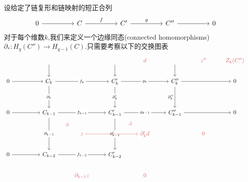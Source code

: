 \documentclass{article}
\begin{document}
\begin{definition}
    设给定了链复形和链映射的短正合列
    \[\begin{tikzcd}
        0 && C && {C'} && {C''} && 0
        \arrow["g", from=1-5, to=1-7]
        \arrow["f", from=1-3, to=1-5]
        \arrow[from=1-7, to=1-9]
        \arrow[from=1-1, to=1-3]
    \end{tikzcd}\]
    对于每个维数$k$,我们来定义一个边缘同态(connected homomorphisms)$\partial_* : H_q(C'') \to H_{q-1}(C)$.只需要考察以下的交换图表
    \[\begin{tikzcd}
        && {} && {} & \textcolor{rgb,255:red,214;green,92;blue,92}{d} & {} & \textcolor{rgb,255:red,214;green,92;blue,92}{z''} & \textcolor{rgb,255:red,214;green,92;blue,92}{Z_k(C_\cdot'')} \\
        0 && {C_{k}} && {C_k'} && {C_k''} && 0 \\
        \\
        0 && {C_{k-1}} && {C_{k-1}'} && {C_{k-1}''} && 0 \\
        &&& \textcolor{rgb,255:red,214;green,92;blue,92}{z} && \textcolor{rgb,255:red,214;green,92;blue,92}{\partial'_k{d}} && \textcolor{rgb,255:red,214;green,92;blue,92}{0} \\
        0 && {C_{k-2}} && {C_{k-2}'} \\
        &&& \textcolor{rgb,255:red,214;green,92;blue,92}{\partial_{k-1}z} && \textcolor{rgb,255:red,214;green,92;blue,92}{0}
        \arrow[from=2-1, to=2-3]
        \arrow["{f_k}"{description}, from=2-3, to=2-5]
        \arrow["{g_k}"{description}, from=2-5, to=2-7]
        \arrow[from=2-7, to=2-9]
        \arrow[from=1-3, to=2-3]
        \arrow[from=1-5, to=2-5]
        \arrow["{\partial_{k}}"{description}, from=2-3, to=4-3]
        \arrow[from=4-1, to=4-3]
        \arrow["{f_{k-1}}"{description}, from=4-3, to=4-5]
        \arrow["{\partial'_{k}}"{description}, from=2-5, to=4-5]
        \arrow["{g_{k-1}}"{description}, from=4-5, to=4-7]
        \arrow[from=1-7, to=2-7]
        \arrow["{\partial''_{k}}"', from=2-7, to=4-7]
        \arrow[from=4-7, to=4-9]
        \arrow["{\partial_{k-1}}"{description}, from=4-3, to=6-3]
        \arrow[from=6-1, to=6-3]
        \arrow["{\partial'_{k-1}}"{description}, from=4-5, to=6-5]
        \arrow["{f_{k-2}}"{description}, from=6-3, to=6-5]
        \arrow["\ni"{marking}, color={rgb,255:red,214;green,92;blue,92}, draw=none, from=5-4, to=4-3]
        \arrow["\ni"{marking}, color={rgb,255:red,214;green,92;blue,92}, draw=none, from=5-6, to=4-5]
        \arrow[color={rgb,255:red,214;green,92;blue,92}, maps to, from=5-4, to=5-6]

\end{tikzcd}\]
\end{definition}
\end{document}

